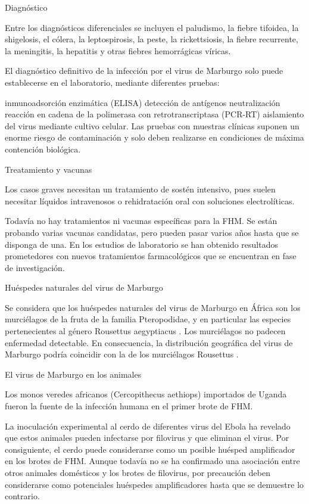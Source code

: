 Diagnóstico

Entre los diagnósticos diferenciales se incluyen el paludismo, la fiebre tifoidea, la shigelosis, el cólera, la leptospirosis, la peste, la rickettsiosis, la fiebre recurrente, la meningitis, la hepatitis y otras fiebres hemorrágicas víricas.

El diagnóstico definitivo de la infección por el virus de Marburgo solo puede establecerse en el laboratorio, mediante diferentes pruebas:

inmunoadsorción enzimática (ELISA)
detección de antígenos
neutralización
reacción en cadena de la polimerasa con retrotranscriptasa (PCR-RT)
aislamiento del virus mediante cultivo celular.
Las pruebas con muestras clínicas suponen un enorme riesgo de contaminación y solo deben realizarse en condiciones de máxima contención biológica.

Treatamiento y vacunas

Los casos graves necesitan un tratamiento de sostén intensivo, pues suelen necesitar líquidos intravenosos o rehidratación oral con soluciones electrolíticas.

Todavía no hay tratamientos ni vacunas específicas para la FHM. Se están probando varias vacunas candidatas, pero pueden pasar varios años hasta que se disponga de una. En los estudios de laboratorio se han obtenido resultados prometedores con nuevos tratamientos farmacológicos que se encuentran en fase de investigación.

Huéspedes naturales del virus de Marburgo

Se considera que los huéspedes naturales del virus de Marburgo en África son los murciélagos de la fruta de la familia Pteropodidae, y en particular las especies pertenecientes al género Rousettus aegyptiacus . Los murciélagos no padecen enfermedad detectable. En consecuencia, la distribución geográfica del virus de Marburgo podría coincidir con la de los murciélagos Rousettus .

El virus de Marburgo en los animales

Los monos veredes africanos (Cercopithecus aethiops) importados de Uganda fueron la fuente de la infección humana en el primer brote de FHM.

La inoculación experimental al cerdo de diferentes virus del Ebola ha revelado que estos animales pueden infectarse por filovirus y que eliminan el virus. Por consiguiente, el cerdo puede considerarse como un posible huésped amplificador en los brotes de FHM. Aunque todavía no se ha confirmado una asociación entre otros animales domésticos y los brotes de filovirus, por precaución deben considerarse como potenciales huéspedes amplificadores hasta que se demuestre lo contrario.

